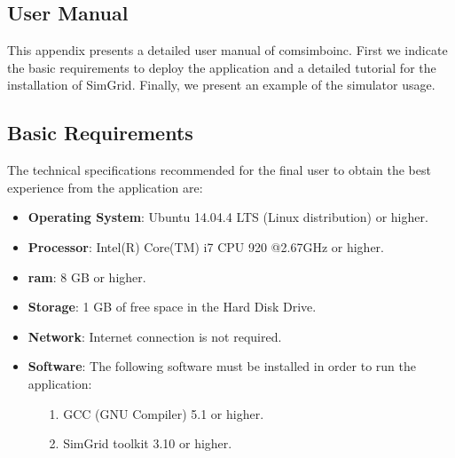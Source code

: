 \chead[]{}
\renewcommand{\headrulewidth}{0.5pt}

\lfoot[]{}
\cfoot[]{}
\rfoot[]{}
\renewcommand{\footrulewidth}{0pt}

\begin{appendices}
\chapter{User Manual}
\label{ch:user_manual}

This appendix presents a detailed user manual of \gls{comsimboinc}. First we indicate the basic requirements to deploy the application and a detailed tutorial for the installation of SimGrid. Finally, we present an example of the simulator usage.

\section{Basic Requirements}

The technical specifications recommended for the final user to obtain the best experience from the application are:

\begin{itemize}

\item \textbf{Operating System}: Ubuntu 14.04.4 LTS (Linux distribution) or higher.

\item \textbf{Processor}: Intel(R) Core(TM) i7 CPU 920 @2.67GHz or higher.

\item \textbf{\gls{ram}}: 8 GB or higher.

\item \textbf{Storage}: 1 GB of free space in the Hard Disk Drive.

\item \textbf{Network}: Internet connection is not required.

\item \textbf{Software}: The following software must be installed in order to run the application:

	\begin{itemize}

	\item[1.] GCC (GNU Compiler) 5.1 or higher.
	
	\item[2.] SimGrid toolkit 3.10 or higher.
	

\end{itemize}
\end{itemize}
\end{appendices}
